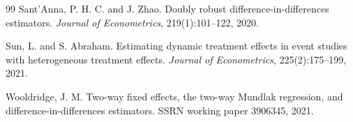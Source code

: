 \documentclass[11pt]{article}
\theoremstyle{definition}
\theoremstyle{plain}
\theoremstyle{remark}
\begin{document}
\begin{thebibliography}{99}
Sant'Anna, P. H. C. and J. Zhao.
\newblock Doubly robust difference-in-differences estimators.
\newblock \emph{Journal of Econometrics}, 219(1):101--122, 2020.

Sun, L. and S. Abraham.
\newblock Estimating dynamic treatment effects in event studies with heterogeneous treatment effects.
\newblock \emph{Journal of Econometrics}, 225(2):175--199, 2021.

Wooldridge, J. M.
\newblock Two-way fixed effects, the two-way Mundlak regression, and difference-in-differences estimators.
\newblock SSRN working paper 3906345, 2021.
\end{thebibliography}
\end{document}
